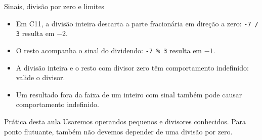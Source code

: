 \begin{frame}{Sinais, divisão por zero e limites}
\begin{itemize}
\item Em C11, a divisão inteira descarta a parte fracionária em direção a zero: \texttt{-7 / 3} resulta em $-2$.
\item O resto acompanha o sinal do dividendo: \texttt{-7 \% 3} resulta em $-1$.
\item A divisão inteira e o resto com divisor zero têm comportamento indefinido: valide o divisor.
\item Um resultado fora da faixa de um inteiro com sinal também pode causar comportamento indefinido.
\end{itemize}
\begin{block}{Prática desta aula}
Usaremos operandos pequenos e divisores conhecidos. Para ponto flutuante, também não devemos depender de uma divisão por zero.
\end{block}
\end{frame}
